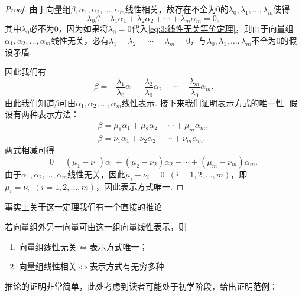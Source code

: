 \begin{enumerate}
          \begin{proof}
              由于向量组$\beta,\alpha_1,\alpha_2,\ldots,\alpha_m$线性相关，故存在不全为0的$\lambda_0,\lambda_1,\ldots,\lambda_m$使得
              \begin{equation}\label{eq:3:线性无关等价定理}
                  \lambda_0\beta+\lambda_1\alpha_1+\lambda_2\alpha_2+\cdots+\lambda_m\alpha_m=0,
              \end{equation}
              其中$\lambda_0$必不为0，因为如果将$\lambda_0=0$代入\autoref{eq:3:线性无关等价定理}，则由于向量组$\alpha_1,\alpha_2,\ldots,\alpha_m$线性无关，必有$\lambda_1=\lambda_2=\cdots=\lambda_m=0$，与$\lambda_0,\lambda_1,\ldots,\lambda_m$不全为0的假设矛盾.

              因此我们有
              \[\beta=-\frac{\lambda_1}{\lambda_0}\alpha_1-\frac{\lambda_2}{\lambda_0}\alpha_2-\cdots-\frac{\lambda_m}{\lambda_0}\alpha_m.\]
              由此我们知道$\beta$可由$\alpha_1,\alpha_2,\ldots,\alpha_m$线性表示. 接下来我们证明表示方式的唯一性. 假设有两种表示方法：
              \begin{gather*}
                  \beta=\mu_1\alpha_1+\mu_2\alpha_2+\cdots+\mu_m\alpha_m, \\
                  \beta=\nu_1\alpha_1+\nu_2\alpha_2+\cdots+\nu_m\alpha_m.
              \end{gather*}
              两式相减可得
              \[0=(\mu_1-\nu_1)\alpha_1+(\mu_2-\nu_2)\alpha_2+\cdots+(\mu_m-\nu_m)\alpha_m.\]
              由于$\alpha_1,\alpha_2,\ldots,\alpha_m$线性无关，因此$\mu_i-\nu_i=0\enspace(i=1,2,\ldots,m)$，即$\mu_i=\nu_i\enspace(i=1,2,\ldots,m)$，因此表示方式唯一.
          \end{proof}

          事实上关于这一定理我们有一个直接的推论
          \begin{corollary}
              若向量组外另一向量可由这一组向量线性表示，则
              \begin{enumerate}
                  \item \label{item:3:线性无关等价表示唯一:1}
                        向量组线性无关$\iff$表示方式唯一；

                  \item \label{item:3:线性无关等价表示唯一:2}
                        向量组线性相关$\iff$表示方式有无穷多种.
              \end{enumerate}
          \end{corollary}
          推论的证明非常简单，此处考虑到读者可能处于初学阶段，给出证明范例：


\end{enumerate}
